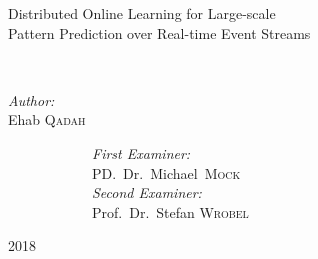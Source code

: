 \begin{titlepage}
\begin{center}
			{ \Large \bfseries 

				Distributed Online Learning for Large-scale  \\Pattern Prediction over Real-time Event Streams}\\[2.9cm]
			
			\begin{minipage}[t]{0.4\textwidth}
				\begin{flushleft} \large
					\emph{Author:}\\
					Ehab \textsc{Qadah}
				\end{flushleft}
			\end{minipage}
			\begin{minipage}[t]{0.5\textwidth}
				\begin{flushleft} \large
					~~~~~~~~~~~~\emph{First Examiner:} \\
					~~~~~~~~~~~~PD.~Dr.~Michael~\textsc{Mock} \\[0.5cm]
					~~~~~~~~~~~~\emph{Second Examiner:} \\
					~~~~~~~~~~~~Prof.~Dr.~Stefan \textsc{Wrobel} \\[0.5cm]
					
				\end{flushleft}
			\end{minipage}
			
			\vfill
			
				{\Large 2018}
		
		\end{center}
	\end{titlepage}